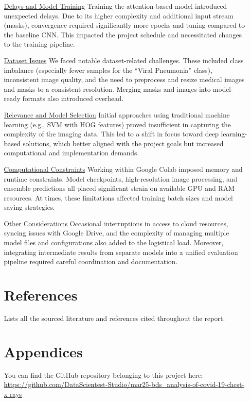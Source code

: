 \documentclass{article}
\begin{document}
\underline{Delays and Model Training}
Training the attention-based model introduced unexpected delays. Due to its higher complexity and additional input stream (masks), convergence required significantly more epochs and tuning compared to the baseline CNN. This impacted the project schedule and necessitated changes to the training pipeline.

\underline{Dataset Issues}
We faced notable dataset-related challenges. These included class imbalance (especially fewer samples for the “Viral Pneumonia” class), inconsistent image quality, and the need to preprocess and resize medical images and masks to a consistent resolution. Merging masks and images into model-ready formats also introduced overhead.

\underline{Relevance and Model Selection}
Initial approaches using traditional machine learning (e.g., SVM with HOG features) proved insufficient in capturing the complexity of the imaging data. This led to a shift in focus toward deep learning-based solutions, which better aligned with the project goals but increased computational and implementation demands.

\underline{Computational Constraints}
Working within Google Colab imposed memory and runtime constraints. Model checkpoints, high-resolution image processing, and ensemble predictions all placed significant strain on available GPU and RAM resources. At times, these limitations affected training batch sizes and model saving strategies.

\underline{Other Considerations}
Occasional interruptions in access to cloud resources, syncing issues with Google Drive, and the complexity of managing multiple model files and configurations also added to the logistical load. Moreover, integrating intermediate results from separate models into a unified evaluation pipeline required careful coordination and documentation.



\section{References}

Lists all the sourced literature and references cited throughout the report.

\section{Appendices}

You can find the GitHub repository belonging to this project here: 
\url{https://github.com/DataScientest-Studio/mar25-bds_analysis-of-covid-19-chest-x-rays} 
\end{document}
